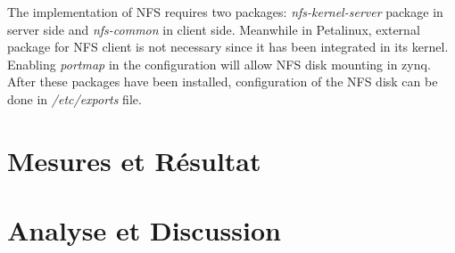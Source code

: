 The implementation of NFS requires two packages: \emph{nfs-kernel-server} package in server side and \emph{nfs-common} in client side.
Meanwhile in Petalinux, external package for NFS client is not necessary since it has been integrated in its kernel. Enabling \emph{portmap} in the configuration will allow NFS disk mounting in zynq.
After these packages have been installed, configuration of the NFS disk can be done in \emph{/etc/exports} file.

\section{Mesures et Résultat}


\blindtext

\section{Analyse et Discussion}

\blindtext